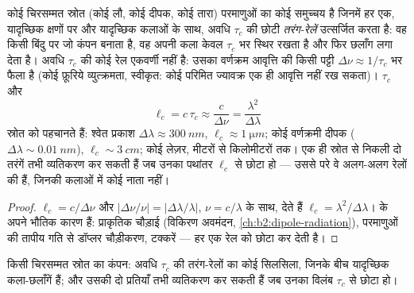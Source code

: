 \begin{proposition}[तरंग-रेलें; संसक्ति काल और लंबाई]\label{prop:b2:scalar-light-model:coherence}
कोई चिरसम्मत स्रोत (कोई लौ, कोई दीपक, कोई तारा) परमाणुओं का कोई समुच्चय है
जिनमें हर एक, यादृच्छिक क्षणों पर और यादृच्छिक कलाओं के साथ, अवधि $\tau_c$ की
छोटी \emph{तरंग-रेलें} उत्सर्जित करता है: वह किसी बिंदु पर जो कंपन बनाता है,
वह अपनी कला केवल $\tau_c$ भर स्थिर रखता है और फिर छलाँग लगा देता है। अवधि $\tau_c$
की कोई रेल एकवर्णी नहीं है: उसका वर्णक्रम आवृत्ति की किसी
पट्टी $\Delta\nu \approx 1/\tau_c$ भर फैला है (कोई फ़ूरिये व्युत्क्रमता, स्वीकृत: कोई परिमित
ज्यावक्र एक ही आवृत्ति नहीं रख सकता)। \emph{}
$\tau_c$ और \emph{}
\[
\ell_c = c\,\tau_c \approx \frac c{\Delta\nu} = \frac{\lambda^2}{\Delta\lambda}
\]
स्रोत को पहचानते हैं: श्वेत प्रकाश $\Delta\lambda \approx \qty{300}{nm}$, $\ell_c
\approx \qty{1}{\micro m}$; कोई वर्णक्रमी दीपक ($\Delta\lambda \sim \qty{0.01}{nm}$), $\ell_c \sim
\qty{3}{cm}$; कोई लेज़र, मीटरों से किलोमीटरों तक। एक ही स्रोत से निकली
दो तरंगें तभी व्यतिकरण कर सकती हैं जब उनका पथांतर
$\ell_c$ से छोटा हो --- उससे परे वे अलग-अलग रेलों की हैं, जिनकी
कलाओं में कोई नाता नहीं।
\end{proposition}

\begin{proof}
$\ell_c = c/\Delta\nu$ और $|\Delta\nu/\nu| = |\Delta\lambda/\lambda|$, $\nu = c/\lambda$ के साथ, देते हैं $\ell_c =
\lambda^2/\Delta\lambda$।  के अपने भौतिक कारण हैं:
प्राकृतिक चौड़ाई (विकिरण अवमंदन, \cref{ch:b2:dipole-radiation}),
परमाणुओं की तापीय गति से डॉप्लर चौड़ीकरण, टक्करें --- हर एक
रेल को छोटा कर देती है।
\end{proof}

\begin{omfigure}

{\small किसी चिरसम्मत स्रोत का कंपन: अवधि $\tau_c$ की तरंग-रेलों का कोई
सिलसिला, जिनके बीच यादृच्छिक कला-छलाँगें हैं; और उसकी दो
प्रतियाँ तभी व्यतिकरण कर सकती हैं जब उनका विलंब $\tau_c$ से छोटा हो।}
\end{omfigure}

